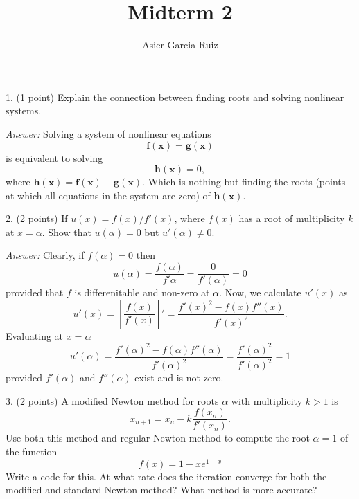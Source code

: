 \documentclass{article}
\title{Midterm 2}
\author{Asier Garcia Ruiz }
\newenvironment{answer}{\textit{Answer:}}{}
\begin{document}
\maketitle

1. (1 point) Explain the connection between finding roots and solving nonlinear
systems.

\begin{answer}
    Solving a system of nonlinear equations
    \begin{equation*}
        \bm{f(x)} = \bm{g(x)}
    \end{equation*}
    is equivalent to solving
    \begin{equation*}
        \bm{h(x)} = 0,
    \end{equation*}
    where $\bm{h(x)} = \bm{f(x)} - \bm{g(x)}$.
    Which is nothing but finding the roots (points at which all equations in
    the system are zero) of $\bm{h(x)}$.
\end{answer}

2. (2 points) If $u(x) = f(x)/f'(x)$, where $f(x)$ has a root of multiplicity
$k$ at $x = \alpha$. Show that $u(\alpha) = 0$ but $u'(\alpha) \neq 0$.

\begin{answer}
    Clearly, if $f(\alpha) = 0$ then
    \begin{equation*}
        u(\alpha) = \frac{f(\alpha)}{f'\alpha} = \frac{0}{f'(\alpha)} = 0
    \end{equation*}
    provided that $f$ is differenitable and non-zero at $\alpha$. Now, we calculate $u'(x)$ as
    \begin{equation*}
        u'(x) = \left[\frac{f(x)}{f'(x)}\right]' =
        \frac{f'(x)^2 - f(x)f''(x)}{f'(x)^2}.
    \end{equation*}
    Evaluating at $x = \alpha$
    \begin{equation*}
        u'(\alpha) = \frac{f'(\alpha)^2 - f(\alpha)f''(\alpha)}{f'(\alpha)^2}
        = \frac{f'(\alpha)^2}{f'(\alpha)^2} = 1
    \end{equation*}
    provided $f'(\alpha)$ and $f''(\alpha)$ exist and is not zero.
\end{answer}

3. (2 points) A modified Newton method for roots $\alpha$ with multiplicity
$k > 1$ is
\begin{equation*}
    x_{n+1} = x_n - k \frac{f(x_n)}{f'(x_n)}.
\end{equation*}
Use both this method and regular Newton method to compute the root
$\alpha = 1$ of the function
\begin{equation*}
    f(x) = 1 - xe^{1-x}
\end{equation*}
Write a code for this. At what rate does the iteration converge for both the
modified and standard Newton method? What method is more accurate?
\end{document}
